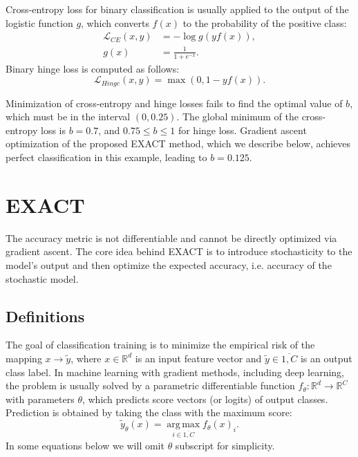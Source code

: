 \documentclass[nohyperref]{article}
\DeclareMathOperator*{\argmax}{arg\,max}
\theoremstyle{plain}
\theoremstyle{definition}
\theoremstyle{remark}
\begin{document}
Cross-entropy loss for binary classification is usually applied to the output of the logistic function $g$, which converts $f(x)$ to the probability of the positive class:
\begin{align}
    \mathcal{L}_{CE}(x, y) &= -\log g(y f(x)), \\
    g(x) &= \frac{1}{1 + e^{-x}}.
\end{align}
Binary hinge loss is computed as follows:
\begin{equation}
    \mathcal{L}_{Hinge}(x, y) = \max(0, 1 - y f(x)).
\end{equation}

Minimization of cross-entropy and hinge losses fails to find the optimal value of $b$, which must be in the interval $(0, 0.25)$. The global minimum of the cross-entropy loss is $b = 0.7$, and $0.75 \le b \le 1$ for hinge loss. Gradient ascent optimization of the proposed EXACT method, which we describe below, achieves perfect classification in this example, leading to $b = 0.125$.

\section{EXACT}
The accuracy metric is not differentiable and cannot be directly optimized via gradient ascent. The core idea behind EXACT is to introduce stochasticity to the model's output and then optimize the expected accuracy, i.e. accuracy of the stochastic model.

\subsection{Definitions}
The goal of classification training is to minimize the empirical risk of the mapping $x \longrightarrow \tilde{y}$, where $x \in \mathbb{R}^d$ is an input feature vector and $\tilde{y} \in \overline{1, C}$ is an output class label. In machine learning with gradient methods, including deep learning, the problem is usually solved by a parametric differentiable function $f_\theta: \mathbb{R}^d \longrightarrow \mathbb{R}^C$ with parameters $\theta$, which predicts score vectors (or logits) of output classes. Prediction is obtained by taking the class with the maximum score:
\begin{equation}
    \tilde{y}_\theta(x) = \argmax\limits_{i \in \overline{1, C}}f_\theta(x)_i.
\end{equation}
In some equations below we will omit $\theta$ subscript for simplicity.
\end{document}
